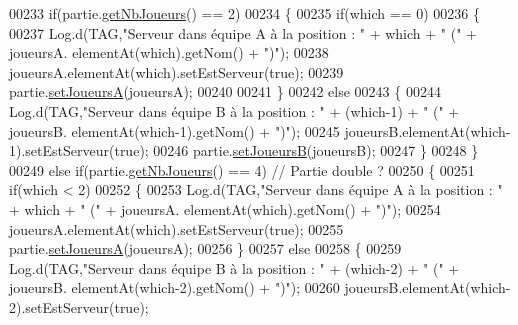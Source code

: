 \begin{DoxyCode}
00233                 \textcolor{keywordflow}{if}(partie.\hyperlink{classcom_1_1example_1_1area_1_1_partie_a70ddc06f598fa7ffb00c315fc9490647}{getNbJoueurs}() == 2)
00234                 \{
00235                     \textcolor{keywordflow}{if}(which == 0)
00236                     \{
00237                         Log.d(TAG,\textcolor{stringliteral}{"Serveur dans équipe A à la position : "} + which + \textcolor{stringliteral}{" ("} + joueursA.
      elementAt(which).getNom() + \textcolor{stringliteral}{")"});
00238                         joueursA.elementAt(which).setEstServeur(\textcolor{keyword}{true});
00239                         partie.\hyperlink{classcom_1_1example_1_1area_1_1_partie_ace9c70bf0685d426f0d3fdb7e4f81f3f}{setJoueursA}(joueursA);
00240 
00241                     \}
00242                     \textcolor{keywordflow}{else}
00243                     \{
00244                         Log.d(TAG,\textcolor{stringliteral}{"Serveur dans équipe B à la position : "} + (which-1) + \textcolor{stringliteral}{" ("} + joueursB.
      elementAt(which-1).getNom() + \textcolor{stringliteral}{")"});
00245                         joueursB.elementAt(which-1).setEstServeur(\textcolor{keyword}{true});
00246                         partie.\hyperlink{classcom_1_1example_1_1area_1_1_partie_a3f3cc9b2ddd055945b8b0835d0e7466b}{setJoueursB}(joueursB);
00247                     \}
00248                 \}
00249                 \textcolor{keywordflow}{else} \textcolor{keywordflow}{if}(partie.\hyperlink{classcom_1_1example_1_1area_1_1_partie_a70ddc06f598fa7ffb00c315fc9490647}{getNbJoueurs}() == 4) \textcolor{comment}{// Partie double ?}
00250                 \{
00251                     \textcolor{keywordflow}{if}(which < 2)
00252                     \{
00253                         Log.d(TAG,\textcolor{stringliteral}{"Serveur dans équipe A à la position : "} + which + \textcolor{stringliteral}{" ("} + joueursA.
      elementAt(which).getNom() + \textcolor{stringliteral}{")"});
00254                         joueursA.elementAt(which).setEstServeur(\textcolor{keyword}{true});
00255                         partie.\hyperlink{classcom_1_1example_1_1area_1_1_partie_ace9c70bf0685d426f0d3fdb7e4f81f3f}{setJoueursA}(joueursA);
00256                     \}
00257                     \textcolor{keywordflow}{else}
00258                     \{
00259                         Log.d(TAG,\textcolor{stringliteral}{"Serveur dans équipe B à la position : "} + (which-2) + \textcolor{stringliteral}{" ("} + joueursB.
      elementAt(which-2).getNom() + \textcolor{stringliteral}{")"});
00260                         joueursB.elementAt(which-2).setEstServeur(\textcolor{keyword}{true});

\end{DoxyCode}
